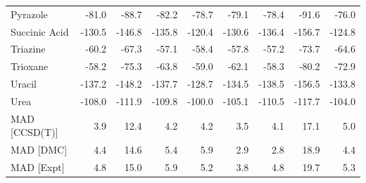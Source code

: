 \begin{table}[h]
\begin{tabular}{lrrrrrrrr}
Pyrazole & -81.0 & -88.7 & -82.2 & -78.7 & -79.1 & -78.4 & -91.6 & -76.0 \\
Succinic Acid & -130.5 & -146.8 & -135.8 & -120.4 & -130.6 & -136.4 & -156.7 & -124.8 \\
Triazine & -60.2 & -67.3 & -57.1 & -58.4 & -57.8 & -57.2 & -73.7 & -64.6 \\
Trioxane & -58.2 & -75.3 & -63.8 & -59.0 & -62.1 & -58.3 & -80.2 & -72.9 \\
Uracil & -137.2 & -148.2 & -137.7 & -128.7 & -134.5 & -138.5 & -156.5 & -133.8 \\
Urea & -108.0 & -111.9 & -109.8 & -100.0 & -105.1 & -110.5 & -117.7 & -104.0 \\
MAD [CCSD(T)] & 3.9 & 12.4 & 4.2 & 4.2 & 3.5 & 4.1 & 17.1 & 5.0 \\
MAD [DMC] & 4.4 & 14.6 & 5.4 & 5.9 & 2.9 & 2.8 & 18.9 & 4.4 \\
MAD [Expt] & 4.8 & 15.0 & 5.9 & 5.2 & 3.8 & 4.8 & 19.7 & 5.3 \\
\bottomrule
\end{tabular}

\end{table}